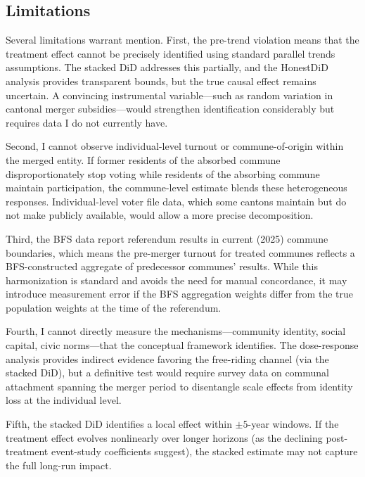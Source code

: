 \documentclass[12pt]{article}
\begin{document}
\subsection{Limitations}

Several limitations warrant mention. First, the pre-trend violation means that the treatment effect cannot be precisely identified using standard parallel trends assumptions. The stacked DiD addresses this partially, and the HonestDiD analysis provides transparent bounds, but the true causal effect remains uncertain. A convincing instrumental variable---such as random variation in cantonal merger subsidies---would strengthen identification considerably but requires data I do not currently have.

Second, I cannot observe individual-level turnout or commune-of-origin within the merged entity. If former residents of the absorbed commune disproportionately stop voting while residents of the absorbing commune maintain participation, the commune-level estimate blends these heterogeneous responses. Individual-level voter file data, which some cantons maintain but do not make publicly available, would allow a more precise decomposition.

Third, the BFS data report referendum results in current (2025) commune boundaries, which means the pre-merger turnout for treated communes reflects a BFS-constructed aggregate of predecessor communes' results. While this harmonization is standard and avoids the need for manual concordance, it may introduce measurement error if the BFS aggregation weights differ from the true population weights at the time of the referendum.

Fourth, I cannot directly measure the mechanisms---community identity, social capital, civic norms---that the conceptual framework identifies. The dose-response analysis provides indirect evidence favoring the free-riding channel (via the stacked DiD), but a definitive test would require survey data on communal attachment spanning the merger period to disentangle scale effects from identity loss at the individual level.

Fifth, the stacked DiD identifies a local effect within $\pm 5$-year windows. If the treatment effect evolves nonlinearly over longer horizons (as the declining post-treatment event-study coefficients suggest), the stacked estimate may not capture the full long-run impact.


\end{document}
